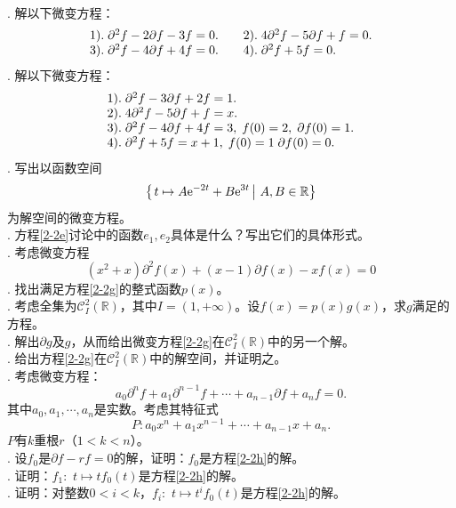 \documentclass[12pt,UTF8]{ctexbook}
\begin{document}
\begin{xt}
    \mbox{} \\
    . 解以下微变方程：\\
    $$
    \begin{array}[]{ll}
        1).\;\partial^2 f - 2 \partial f - 3 f = 0. &\quad2).\; 4\partial^2 f - 5 \partial f + f = 0. \\
        3).\;\partial^2 f - 4 \partial f + 4 f = 0. &\quad4).\; \partial^2 f + 5 f = 0. 
    \end{array}
    $$
    . 解以下微变方程：\\
    $$
    \begin{array}[]{l}
        1).\;\partial^2 f - 3 \partial f + 2 f = 1. \\
        2).\; 4\partial^2 f - 5 \partial f + f = x. \\
        3).\;\partial^2 f - 4 \partial f + 4 f = 3, \; f(0) = 2,\; \partial f(0) = 1.\\
        4).\; \partial^2 f + 5 f = x + 1,\; f(0)=1\; \partial f(0) = 0. 
    \end{array}
    $$
    . 写出以函数空间
    $$ \left\{\left.t \mapsto A\mathrm{e}^{-2t} + B\mathrm{e}^{3t}\,\right|\, A, B \in \mathbb{R}\right\} $$
    为解空间的微变方程。\\
    . 方程\eqref{2-2e}讨论中的函数$e_1, e_2$具体是什么？写出它们的具体形式。\\
    . 考虑微变方程
    \begin{equation}
        (x^2 + x) \partial^2 f(x) + (x - 1) \partial f(x) - x f(x) = 0 \label{2-2g} \tag{a}
    \end{equation}
    . 找出满足方程\eqref{2-2g}的整式函数$p(x)$。\\
    . 考虑全集为$\mathcal{C}^2_{I}(\mathbb{R})$，其中$I = (1, +\infty)$。设$f(x) = p(x)g(x)$，求$g$满足的方程。\\
    . 解出$\partial g$及$g$，从而给出微变方程\eqref{2-2g}在$\mathcal{C}^2_{I}(\mathbb{R})$中的另一个解。\\
    . 给出方程\eqref{2-2g}在$\mathcal{C}^2_{I}(\mathbb{R})$中的解空间，并证明之。\\
    . 考虑微变方程：
    \begin{equation}
        a_0\partial^n f + a_1 \partial^{n-1} f + \cdots + a_{n-1}\partial f + a_n f = 0. \label{2-2h} \tag{b}
    \end{equation}
    其中$a_0, a_1, \cdots , a_n$是实数。考虑其特征式
    $$P: a_0x^n + a_1 x^{n-1} + \cdots + a_{n-1}x + a_n . $$
    $P$有$k$重根$r$（$1<k<n$）。\\
    . 设$f_0$是$\partial f - rf = 0$的解，证明：$f_0$是方程\eqref{2-2h}的解。\\
    . 证明：$f_1:\,\,t\mapsto tf_0(t)$是方程\eqref{2-2h}的解。\\
    . 证明：对整数$0<i<k$，$f_i:\,\,t\mapsto t^if_0(t)$是方程\eqref{2-2h}的解。
\end{xt}
\end{document}
